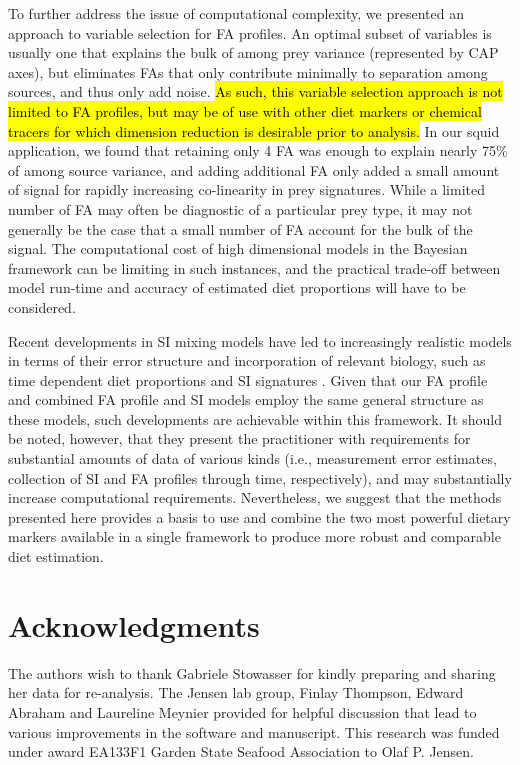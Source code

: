 \documentclass[fleqn,10pt]{wlpeerj}
\begin{document}
To further address the issue of computational complexity, we presented
an approach to variable selection for FA profiles. An optimal subset of
variables is usually one that explains the bulk of among prey variance
(represented by CAP axes), but eliminates FAs that only contribute
minimally to separation among sources, and thus only add noise. \hl{As such, this variable selection approach is not limited to FA profiles, but may be of use with other diet markers or chemical tracers for which dimension reduction is desirable prior to analysis.} In our
squid application, we found that retaining only 4 FA was enough to
explain nearly 75\% of among source variance, and adding additional FA
only added a small amount of signal for rapidly increasing
co-linearity in prey signatures. While a limited number of FA may
often be diagnostic of a particular prey type, it may not generally be
the case that a small number of FA account for the bulk of the
signal. The computational cost of high dimensional models in the
Bayesian framework can be limiting in such instances, and the
practical trade-off between model run-time and accuracy of estimated
diet proportions will have to be considered.

Recent developments in SI mixing models have led to increasingly
realistic models in terms of their error structure \citep{hopkins_estimating_2012} and
incorporation of relevant biology, such as time dependent diet
proportions and SI signatures \citep{parnell_bayesian_2012}. Given that our FA profile and combined
FA profile and SI models employ the same general structure as these models,
such developments are achievable within this framework. It should be
noted, however, that they present the practitioner with requirements for substantial
amounts of data of various kinds (i.e., measurement error estimates,
collection of SI and FA profiles through time, respectively), and may
substantially increase computational requirements. Nevertheless, we
suggest that the methods presented here provides a basis to use and
combine the two most powerful dietary markers available in
a single framework to produce more robust and comparable diet estimation.


\section*{Acknowledgments}

The authors wish to thank Gabriele Stowasser for kindly preparing and sharing her data for re-analysis. The Jensen lab group, Finlay Thompson, Edward Abraham and Laureline Meynier provided for helpful discussion that lead to various improvements in the software and manuscript. This research was funded under award EA133F1 Garden State Seafood Association to Olaf P. Jensen.


\end{document}
